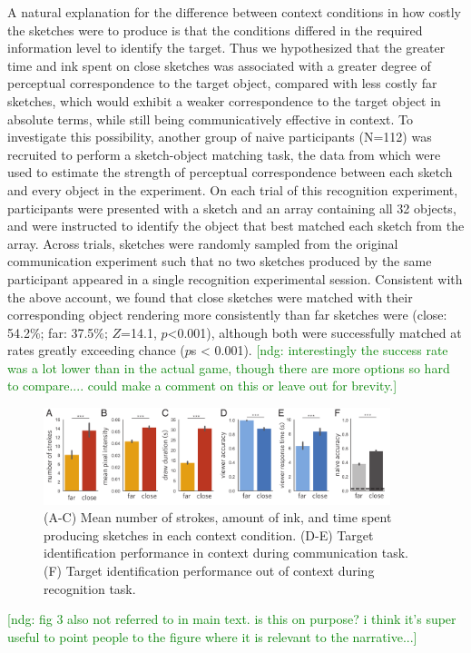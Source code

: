 \documentclass[9pt,twocolumn,twoside]{pnas-new}
\newcommand{\ndg}[1]{\textcolor{Green}{[ndg: #1]}}
\begin{document}
A natural explanation for the difference between context conditions in how costly the sketches were to produce is that the conditions differed in the required information level to identify the target.
Thus we hypothesized that the greater time and ink spent on close sketches was associated with a greater degree of perceptual correspondence to the target object, compared with less costly far sketches, which would exhibit a weaker correspondence to the target object in absolute terms, while still being communicatively effective in context. 
To investigate this possibility, another group of naive participants (N=112) was recruited to perform a sketch-object matching task, the data from which were used to estimate the strength of perceptual correspondence between each sketch and every object in the experiment. 
On each trial of this recognition experiment, participants were presented with a sketch and an array containing all 32 objects, and were instructed to identify the object that best matched each sketch from the array. 
Across trials, sketches were randomly sampled from the original communication experiment such that no two sketches produced by the same participant appeared in a single recognition experimental session. 
Consistent with the above account, we found that close sketches were matched with their corresponding object rendering more consistently than far sketches were (close: 54.2\%; far: 37.5\%; $Z$=14.1, $p$<0.001), although both were successfully matched at rates greatly exceeding chance ($p$s < 0.001).
\ndg{interestingly the success rate was a lot lower than in the actual game, though there are more options so hard to compare.... could make a comment on this or leave out for brevity.}

\begin{figure}[htbp]
\centering
\includegraphics[width=0.9\textwidth]{figures/3_behavioral_performance.pdf}
\caption{(A-C) Mean number of strokes, amount of ink, and time spent producing sketches in each context condition. (D-E) Target identification performance in context during communication task. (F) Target identification performance out of context during recognition task.}
\label{task_performance}
\end{figure}
\ndg{fig 3 also not referred to in main text. is this on purpose? i think it's super useful to point people to the figure where it is relevant to the narrative...}
\end{document}
